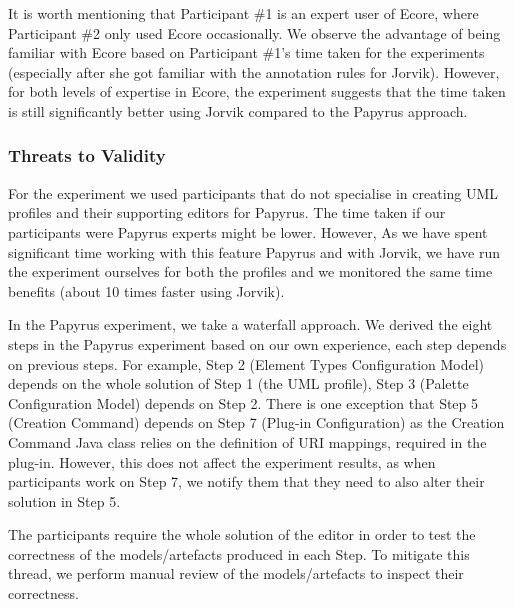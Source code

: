 It is worth mentioning that Participant \#1 is an expert user of Ecore, where Participant \#2 only used Ecore occasionally. 
We observe the advantage of being familiar with Ecore based on Participant \#1's time taken for the experiments (especially after she got familiar with the annotation rules for Jorvik).
However, for both levels of expertise in Ecore, the experiment suggests that the time taken is still significantly better using Jorvik compared to the Papyrus approach.

\subsubsection{Threats to Validity}
For the experiment we used participants that do not specialise in creating UML profiles and their supporting editors for Papyrus. The time taken if our participants were Papyrus experts might be lower.
However, As we have spent significant time working with this feature Papyrus and with Jorvik, we have run the experiment ourselves for both the profiles and we monitored the same time benefits (about 10 times faster using Jorvik). 

In the Papyrus experiment, we take a waterfall approach.
We derived the eight steps in the Papyrus experiment based on our own experience, each step depends on previous steps. 
For example, Step 2 (Element Types Configuration Model) depends on the whole solution of Step 1 (the UML profile), Step 3 (Palette Configuration Model) depends on Step 2. 
There is one exception that Step 5 (Creation Command) depends on Step 7 (Plug-in Configuration) as the Creation Command Java class relies on the definition of URI mappings, required in the plug-in. 
However, this does not affect the experiment results, as when participants work on Step 7, we notify them that they need to also alter their solution in Step 5.

The participants require the whole solution of the editor in order to test the correctness of the models/artefacts produced in each Step. 
To mitigate this thread, we perform manual review of the models/artefacts to inspect their correctness. 


